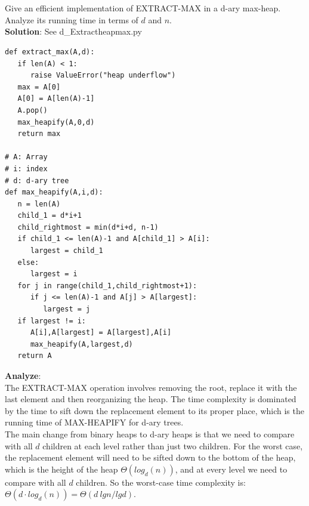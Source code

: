 \documentclass[UTF8]{ctexart}
\begin{document}
\section{}
Give an efficient implementation of EXTRACT-MAX in a d-ary max-heap. Analyze its running time in terms of $d$ and $n$.\\
\textbf{Solution}: See d\_Extractheapmax.py
\begin{lstlisting}
def extract_max(A,d):
   if len(A) < 1:
      raise ValueError("heap underflow")
   max = A[0]
   A[0] = A[len(A)-1]
   A.pop()
   max_heapify(A,0,d)
   return max

# A: Array
# i: index
# d: d-ary tree
def max_heapify(A,i,d):
   n = len(A)
   child_1 = d*i+1
   child_rightmost = min(d*i+d, n-1) 
   if child_1 <= len(A)-1 and A[child_1] > A[i]:
      largest = child_1
   else:
      largest = i
   for j in range(child_1,child_rightmost+1):
      if j <= len(A)-1 and A[j] > A[largest]:
         largest = j
   if largest != i:
      A[i],A[largest] = A[largest],A[i]
      max_heapify(A,largest,d)
   return A
\end{lstlisting}
\textbf{Analyze}:\\
The EXTRACT-MAX operation involves removing the root, replace it with the last element and then reorganizing the heap. 
The time complexity is dominated by the time to sift down the replacement element to its proper place, which is the running time of MAX-HEAPIFY for d-ary trees.\\
The main change from binary heaps to d-ary heaps is that we need to compare with all $d$ children at each level rather than just two children.
For the worst case, the replacement element will need to be sifted down to the bottom of the heap, which is the height of the heap $\Theta(log_d(n))$, and at every level we need to compare with all $d$ children.
So the worst-case time complexity is: $\Theta(d \cdot log_d(n)) = \Theta(d \ lgn/lgd)$.
\end{document}
